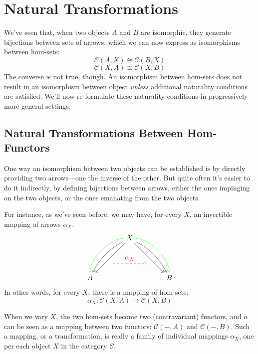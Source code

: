 \documentclass[DaoFP]{subfiles}
\begin{document}
\setcounter{chapter}{8}

\chapter{Natural Transformations}

We've seen that, when two objects $A$ and $B$ are isomorphic, they generate bijections between sets of arrows, which we can now express as isomorphisms between hom-sets:
\[\mathcal{C}(A, X) \cong \mathcal{C}(B, X)\]
\[\mathcal{C}(X, A) \cong \mathcal{C}(X, B)\]
The converse is not true, though. An isomorphism between hom-sets does not result in an isomorphism between object \emph{unless} additional naturality conditions are satisfied. We'll now re-formulate these naturality conditions in progressively more general settings.

\section{Natural Transformations Between Hom-Functors}

One way an isomorphism between two objects can be established is by directly providing two arrows---one the inverse of the other. But quite often it's easier to do it indirectly, by defining bijections between arrows, either the ones impinging on the two objects, or the ones emanating from the two objects. 

For instance, as we've seen before, we may have, for every $X$, an invertible mapping of arrows $\alpha_X$.
\[
 \begin{tikzcd}
 \node(x) at (0, 2) {X};
 \node(a) at (-2, 0) {A};
 \node(b) at (2, 0) {B};
 \node(c1) at (-1, 1.5) {};
 \node(c2) at (-1.5, 1) {};
 \node(c3) at (-1, 2) {};
 \node(c4) at (-2, 1) {};
 \node(d1) at (1, 1.5) {};
 \node(d2) at (1.5, 1) {};
 \node(d3) at (1, 2) {};
 \node(d4) at (2, 1) {};
\node (aa) at (-1, 0.75) {};
 \node (bb) at (1, 0.75) {};
 \draw[->] (x) .. controls (c1)  and (c2) .. (a); %
 \draw[->, green] (x) .. controls (c3)  and (c4) .. (a); %
 \draw[->, blue] (x) -- (a); 
  \draw[->] (x) .. controls (d1)  and (d2) .. (b); %
 \draw[->, green] (x) .. controls (d3)  and (d4) .. (b); %
 \draw[->, blue] (x) -- (b); 
 \draw[->, red, dashed] (aa) -- node[above]{\alpha_X} (bb);
 \end{tikzcd}
\]
In other words, for every $X$, there is a mapping of hom-sets:
\[ \alpha_X \colon \mathcal{C}(X, A) \to \mathcal{C}(X, B) \]

When we vary $X$, the two hom-sets become two (contravariant) functors, and $\alpha$ can be seen as a mapping between two functors:  $\mathcal{C}(-, A)$ and $\mathcal{C}(-, B)$. Such a mapping, or a transformation, is really a family of individual mappings $\alpha_X$, one per each object $X$ in the category $\mathcal{C}$. 
\end{document}
